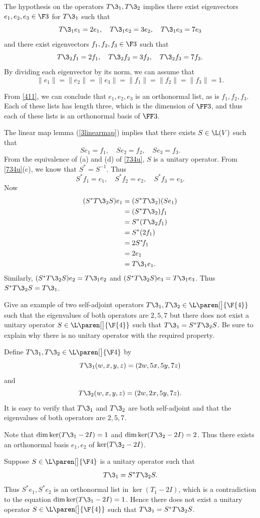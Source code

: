 \begin{Solution}
The hypothesis on the operators $T\3_1, T\3_2$ implies there exist eigenvectors \mbox{$e_1, e_2, e_3 \in \F3$} for $T\3_1$ such that
\[
T\3_1e_1= 2 e_1, \quad T\3_1e_2 = 3 e_2, \quad T\3_1e_3 = 7e_3
\]
and there exist eigenvectors $f_1, f_2, f_3 \in \F3$ such that
\[
T\3_2f_1= 2 f_1, \quad T\3_2f_2 = 3 f_2, \quad T\3_2f_3 = 7f_3.
\]
By dividing each eigenvector by its norm, we can assume that
\[
\|e_1\| = \|e_2\| = \|e_3\| = \|f_1\| = \|f_2\| = \|f_3\| = 1.
\]

From \ref{411}, we can conclude that $e_1, e_2, e_3$ is an orthonormal list, as is $f_1, f_2, f_3$. Each of these lists has length three, which is the dimension of $\FF3$, and thus each of these lists is an orthonormal basis of $\FF3$.

The linear map lemma (\ref{3linearmap}) implies that there exists $S \in \L(V)$ such that
\[
Se_1 = f_1, \quad Se_2 = f_2, \quad Se_3=f_3.
\]
From the equivalence of (a) and (d) of \ref{734u}, $S$ is a unitary operator. From \ref{734u}(c), we know that $S^* = S^{-1}$. Thus
 \[
 S^* \! f_1 = e_1, \quad S^* \! f_2 = e_2, \quad S^* \! f_3=e_3.
 \]
 Now
 \pagebreak[0]
 \begin{align*}
( S^*T\3_2S) e_1 &= (S^*T\3_2)(Se_1)\\
& = (S^*T\3_2)f_1 \\
&= S^* (T\3_2 f_1) \\
&= S^*(2f_1) \\
&= 2 S^* \! f_1 \\
&= 2 e_1\\
&= T\3_1e_1.
\end{align*}
Similarly, $( S^*T\3_2S) e_2 = T\3_1 e_2$ and $( S^*T\3_2S) e_3 = T\3_1 e_3$. Thus $ S^*T\3_2S= T\3_1$.
\end{Solution}

\exercise
Give an example of two self-adjoint operators $T\3_1, T\3_2 \in \L\paren[\big]{\F{4}}$ such that the eigenvalues of both operators are $2, 5, 7$ but there does not exist a unitary operator $S\in \L\paren[\big]{\F{4}}$ such that
$T\3_1 = S^* T\3_2 S$.
Be sure to explain why there is no unitary operator with the required property.

\begin{Solution}
Define $T\3_1, T\3_2 \in \L\paren[\big]{\F4}$ by
\[
T\3_1(w, x, y, z) = (2w, 5x, 5y, 7z)
\]
and
\[
T\3_2(w,x,y,z) = (2w, 2x, 5y, 7z).
\]
It is easy to verify that $T\3_1$ and $T\3_2$ are both self-adjoint and that the eigenvalues of both operators are $2, 5, 7$.

Note that $\dim \ker (T\3_1- 2I) = 1$ and $\dim \ker (T\3_2- 2I) = 2$. Thus there exists an orthonormal basis $e_1, e_2$ of $\ker (T\3_2 - 2I)$.

Suppose $S \in \L\paren[\big]{\F4}$ is a unitary operator such that
\[
T\3_1 = S^* T\3_2 S.
\]
Thus $S^* e_1, S^* e_2$ is an orthonormal list in $\ker (T _1 - 2I)$, which is a contradiction to the equation $\dim \ker (T\3_1- 2I) = 1$. Hence there does not exist a unitary operator $S\in \L\paren[\big]{\F{4}}$ such that
$T\3_1 = S^* T\3_2 S$.
\end{Solution}

